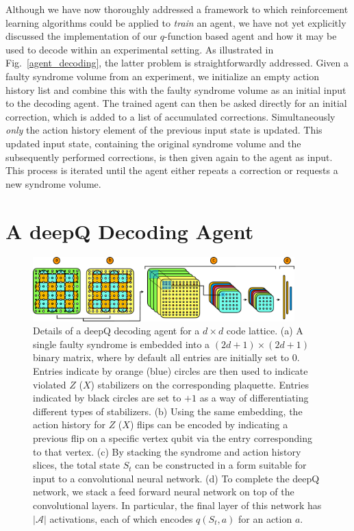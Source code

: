 \documentclass[twocolumn,preprintnumbers,amsmath,amssymb,notitlepage,nofootinbib,longbibliography,superscriptaddress,aps,pra,10pt]{revtex4-1}
\begin{document}
	Although we have now thoroughly addressed a framework to which reinforcement learning algorithms could be applied to \textit{train} an agent, we have not yet explicitly discussed the implementation of our $q$-function based agent and how it may be used to decode within an experimental setting.
	As illustrated in Fig.~\ref{agent_decoding}, the latter problem is straightforwardly addressed.
	Given a faulty syndrome volume from an experiment, we initialize an empty action history list and combine this with the faulty syndrome volume as an initial input to the decoding agent.
	The trained agent can then be asked directly for an initial correction, which is added to a list of accumulated corrections.
	Simultaneously \textit{only} the action history element of the previous input state is updated.
	This updated input state, containing the original syndrome volume and the subsequently performed corrections, is then given again to the agent as input.
	This process is iterated until the agent either repeats a correction or requests a new syndrome volume.

\section{A deepQ Decoding Agent}\label{s:dq_agent}

	\begin{figure}
		\centering
		\includegraphics[width=0.9\textwidth]{figures/agent.pdf}
		\caption{
			Details of a deepQ decoding agent for a $d\times d$ code lattice.
			(a) A single faulty syndrome is embedded into a $(2d +1)\times(2d+1)$ binary matrix, where by default all entries are initially set to $0$.
			Entries indicate by orange (blue) circles are then used to indicate violated $Z$ ($X$) stabilizers on the corresponding plaquette.
			Entries indicated by black circles are set to $+1$ as a way of differentiating different types of stabilizers.
			(b) Using the same embedding, the action history for $Z$ ($X$) flips can be encoded by indicating a previous flip on a specific vertex qubit via the entry corresponding to that vertex.
			(c) By stacking the syndrome and action history slices, the total state $S_t$ can be constructed in a form suitable for input to a convolutional neural network.
			(d) To complete the deepQ network, we stack a feed forward neural network on top of the convolutional layers.
			In particular, the final layer of this network has $|\mathcal{A}|$ activations, each of which encodes $q(S_t,a)$ for an action $a$.
		}
		\label{f:agent}
	\end{figure}
\end{document}
